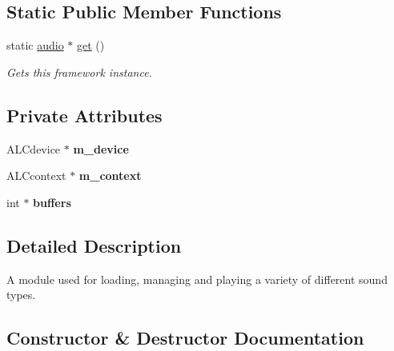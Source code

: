 \subsection*{Static Public Member Functions}
\begin{DoxyCompactItemize}
\item 
static \hyperlink{classflounder_1_1audio}{audio} $\ast$ \hyperlink{classflounder_1_1audio_ac827774b8855e8a921ef9141c2515df8}{get} ()
\begin{DoxyCompactList}\small\item\em Gets this framework instance. \end{DoxyCompactList}\end{DoxyCompactItemize}
\subsection*{Private Attributes}
\begin{DoxyCompactItemize}
\item 
\mbox{\label{classflounder_1_1audio_a6e577784668fbd39f2d6aa8e45bd2983}} 
A\+L\+Cdevice $\ast$ {\bfseries m\+\_\+device}
\item 
\mbox{\label{classflounder_1_1audio_a361e675d6029769f9a366354a3e1cb61}} 
A\+L\+Ccontext $\ast$ {\bfseries m\+\_\+context}
\item 
\mbox{\label{classflounder_1_1audio_a58379153a6620d70633e20b4660502ea}} 
int $\ast$ {\bfseries buffers}
\end{DoxyCompactItemize}


\subsection{Detailed Description}
A module used for loading, managing and playing a variety of different sound types. 



\subsection{Constructor \& Destructor Documentation}
\mbox{\label{classflounder_1_1audio_a0aabbb226f542847145d89adb1144c16}} 
